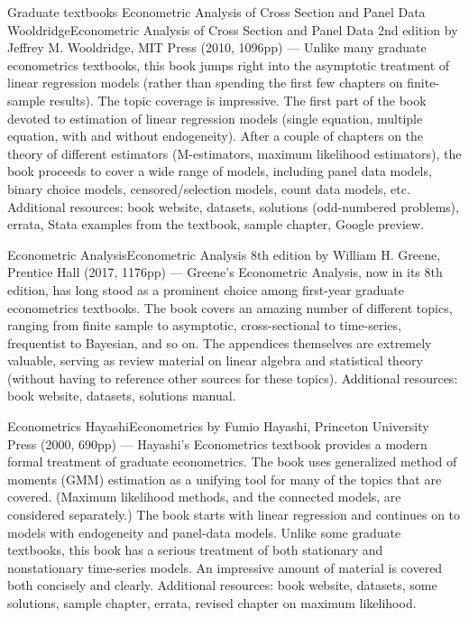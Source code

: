 Graduate textbooks
Econometric Analysis of Cross Section and Panel Data WooldridgeEconometric Analysis of Cross Section and Panel Data 2nd edition by Jeffrey M. Wooldridge, MIT Press (2010, 1096pp) --- Unlike many graduate econometrics textbooks, this book jumps right into the asymptotic treatment of linear regression models (rather than spending the first few chapters on finite-sample results).  The topic coverage is impressive.  The first part of the book devoted to estimation of linear regression models (single equation, multiple equation, with and without endogeneity).  After a couple of chapters on the theory of different estimators (M-estimators, maximum likelihood estimators), the book proceeds to cover a wide range of models, including panel data models, binary choice models, censored/selection models, count data models, etc.  Additional resources:  book website, datasets, solutions (odd-numbered problems), errata, Stata examples from the textbook, sample chapter, Google preview.

Econometric AnalysisEconometric Analysis 8th edition by William H. Greene, Prentice Hall (2017, 1176pp) --- Greene's Econometric Analysis, now in its 8th edition, has long stood as a prominent choice among first-year graduate econometrics textbooks.  The book covers an amazing number of different topics, ranging from finite sample to asymptotic, cross-sectional to time-series, frequentist to Bayesian, and so on.  The appendices themselves are extremely valuable, serving as review material on linear algebra and statistical theory (without having to reference other sources for these topics).  Additional resources:  book website, datasets, solutions manual.

Econometrics HayashiEconometrics by Fumio Hayashi, Princeton University Press (2000, 690pp) --- Hayashi's Econometrics textbook provides a modern formal treatment of graduate econometrics.  The book uses generalized method of moments (GMM) estimation as a unifying tool for many of the topics that are covered.  (Maximum likelihood methods, and the connected models, are considered separately.)  The book starts with linear regression and continues on to models with endogeneity and panel-data models.  Unlike some graduate textbooks, this book has a serious treatment of both stationary and nonstationary time-series models.  An impressive amount of material is covered both concisely and clearly.  Additional resources:  book website, datasets, some solutions, sample chapter, errata, revised chapter on maximum likelihood.

